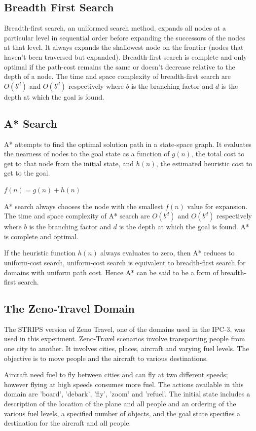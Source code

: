 \documentclass[letterpaper]{article}
\begin{document}
\subsection{Breadth First Search}
Breadth-first search, an uniformed search method, expands all nodes at a particular level in sequential
order before expanding the successors of the nodes at that level. It always expands the shallowest node
on the frontier (nodes that haven't been traversed but expanded). Breadth-first search is complete and
only optimal if the path-cost remains the same or doesn't decrease relative to the depth of a node. The
time and space complexity of breadth-first search are $O(b^d)$ and $O(b^d)$ respectively where $b$ is the
branching factor and $d$ is the depth at which the goal is found.

\subsection{A* Search}
A* attempts to find
the optimal solution path in a state-space graph. It evaluates the nearness of nodes to the goal state as a
function of $g(n)$, the total cost to get to that node from the initial state, and $h(n)$, the estimated heuristic cost
to get to the goal.
\begin{center}
$f(n) = g(n) + h(n)$
\end{center}
A* search always chooses the node with the smallest $f(n)$ value for expansion. The time and space
complexity of A* search are $O(b^d)$ and $O(b^d)$ respectively where $b$ is the branching factor and $d$ is the
depth at which the goal is found. A* is complete and optimal.

If the heuristic function $h(n)$ always evaluates to zero, then A* reduces to uniform-cost search, uniform-cost search is equivalent to breadth-first search for domains with uniform path cost. Hence A* can be said to be a form of breadth-first search.


\subsection{The Zeno-Travel Domain}
The STRIPS version of Zeno Travel, one of the domains used in the IPC-3, was used in this experiment. Zeno-Travel scenarios involve transporting people from one city to another. It involves cities, places, aircraft and varying fuel levels. The objective is to move people and the aircraft to various destinations.

Aircraft need fuel to fly between cities and can fly at two different speeds; however flying at high
speeds consumes more fuel. The actions available in this domain are 'board', 'debark', 'fly', 'zoom' and
'refuel'. The initial state includes a description of the location of the plane and all people and an ordering
of the various fuel levels, a specified number of objects, and the goal state specifies a destination for
the aircraft and all people.
\end{document}
